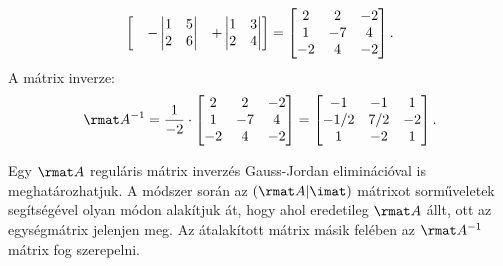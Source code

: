 \documentclass[a4paper, 12pt]{scrartcl}
\begin{document}
\begin{example}
$$\begin{bmatrix}
       &
      - \begin{vmatrix}
          1 & 5 \\
          2 & 6
        \end{vmatrix}
       &
      + \begin{vmatrix}
          1 & 3 \\
          2 & 4
        \end{vmatrix}
    \end{bmatrix}
    =
    \begin{bmatrix}
      2  & 2  & -2 \\
      1  & -7 & 4  \\
      -2 & 4  & -2
    \end{bmatrix}
    \text.
  $$
  A mátrix inverze:
  $$
    \rmat A^{-1} = \frac{1}{-2} \cdot \begin{bmatrix}
      2  & 2  & -2 \\
      1  & -7 & 4  \\
      -2 & 4  & -2
    \end{bmatrix}
    = \begin{bmatrix}
      -1   & -1  & 1  \\
      -1/2 & 7/2 & -2 \\
      1    & -2  & 1
    \end{bmatrix}
    \text.
  $$
\end{example}

\begin{blueBox}

  Egy $\rmat A$ reguláris mátrix inverzés Gauss-Jordan eliminációval
  is meghatározhatjuk. A módszer során az $(\rmat A | \imat)$ mátrixot
  sorműveletek segítségével olyan módon alakítjuk át, hogy ahol eredetileg
  $\rmat A$ állt, ott az egységmátrix jelenjen meg. Az átalakított mátrix
  másik felében az $\rmat A^{-1}$ mátrix fog szerepelni.
\end{blueBox}
\end{document}
